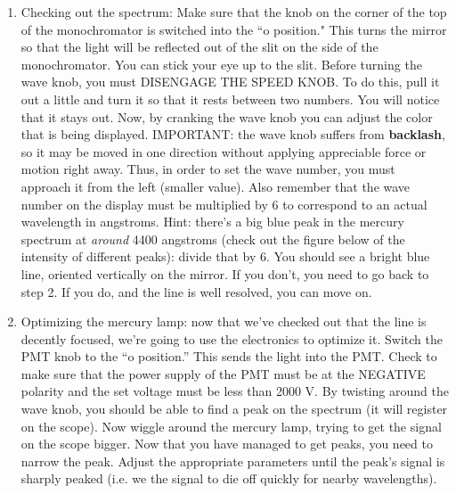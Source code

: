 \documentclass{../lab}
\begin{document}
\begin{enumerate}
    \item Checking out the spectrum:  Make sure that the knob on the corner of the top of the monochromator is switched into the ``o position." This turns the mirror so that the light will be reflected out of the slit on the side of the monochromator. You can stick your eye up to the slit. Before turning the wave knob, you must DISENGAGE THE SPEED KNOB. To do this, pull it out a little and turn it so that it rests between two numbers. You will notice that it stays out. Now, by cranking the wave knob you can adjust the color that is being displayed. IMPORTANT: the wave knob suffers from \textbf{backlash}, so it may be moved in one direction without applying appreciable force or motion right away. Thus, in order to set the wave number, you must approach it from the left (smaller value). Also remember that the wave number on the display must be multiplied by 6 to correspond to an actual wavelength in angstroms. Hint: there's a big blue peak in the mercury spectrum at \textit{around} 4400 angstroms (check out the figure below of the intensity of different peaks): divide that by 6. You should see a bright blue line, oriented vertically on the mirror. If you don't, you need to go back to step 2. If you do, and the line is well resolved, you can move on.
    
    \item Optimizing the mercury lamp: now that we've checked out that the line is decently focused, we're going to use the electronics to optimize it. Switch the PMT knob to the ``o position.'' This sends the light into the PMT. Check to make sure that the power supply of the PMT must be at the NEGATIVE polarity and the set voltage must be less than 2000 V. By twisting around the wave knob, you should be able to find a peak on the spectrum (it will register on the scope). Now wiggle around the mercury lamp, trying to get the signal on the scope bigger. Now that you have managed to get peaks, you need to narrow the peak. Adjust the appropriate parameters until the peak's signal is sharply peaked (i.e. we the signal to die off quickly for nearby wavelengths).
    
    

\end{enumerate}
\end{document}
